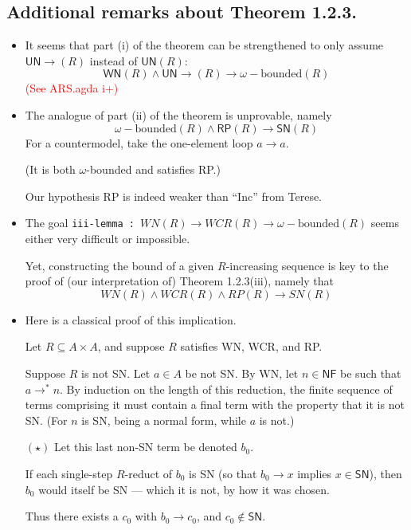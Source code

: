 \documentclass{scrartcl}
\begin{document}
\newcommand{\RP}{\mathsf{RP}}
\newcommand{\NF}{\mathsf{NF}}
\newcommand{\UN}{\mathsf{UN}}
\newcommand{\UNto}{\mathsf{UN}{\to}}
\newcommand{\SN}{\mathsf{SN}}
\newcommand{\WN}{\mathsf{WN}}
\newcommand{\from}{\leftarrow}

\subsection*{Additional remarks about Theorem 1.2.3.}
\begin{itemize}
  \item It seems that part (i) of the theorem can be strengthened to only
  assume $\UNto(R)$ instead of $\UN(R)$:
  \[ \WN(R) \land \UNto(R) \to \omega{-}\text{bounded}(R) \tag{i} \]
  \textcolor{red}{(See ARS.agda i+)}
  \item The analogue of part (ii) of the theorem is unprovable, namely
  \[ \omega{-}\text{bounded}(R) \land \RP(R) \to \SN(R) \tag{ii}\]
  For a countermodel, take the one-element loop $a \to a$.

  (It is both $\omega${-}bounded and satisfies RP.)

  Our hypothesis RP is indeed weaker than ``Inc'' from Terese.
  \item The goal \texttt{iii-lemma :  $WN(R) \to WCR(R) \to \omega{-}\text{bounded}(R)$}
  seems either very difficult or impossible.

  Yet, constructing the bound of a given $R$-increasing sequence is key to the proof of
  (our interpretation of) Theorem 1.2.3(iii), namely that
  \[ WN(R) \land WCR(R) \land RP(R) \to SN(R) \tag{iii} \]
  \item Here is a classical proof of this implication.

  Let $R \subseteq A \times A$, and suppose $R$ satisfies WN, WCR, and RP.

  Suppose $R$ is not SN.  Let $a \in A$ be not SN.  By WN, let $n \in \NF$ be
  such that $a \to^* n$.  By induction on the length of this reduction, the finite sequence
  of terms comprising it must contain a final term with the property that
  it is not SN.  (For $n$ is SN, being a normal form, while $a$ is not.)

  $(\star)$ Let this last non-SN term be denoted $b_0$.

  If each single-step $R$-reduct of $b_0$ is SN (so that $b_0 \to x$ implies $x\in \SN$),
  then $b_0$ would itself be SN --- which it is not, by how it was chosen.

  Thus there exists a $c_0$ with $b_0 \to c_0$, and $c_0 \notin \SN$.


\end{itemize}
\end{document}
